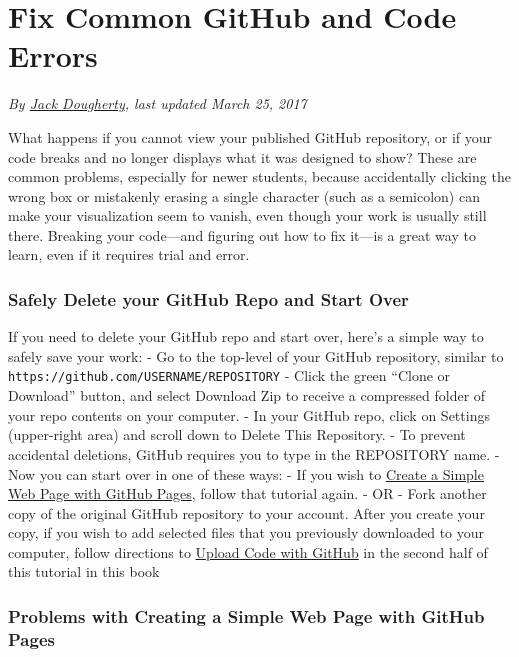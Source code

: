 \documentclass[
  english,
]{book}
\begin{document}
\hypertarget{fix-code}{%
\section{Fix Common GitHub and Code Errors}\label{fix-code}}

\emph{By \href{authors}{Jack Dougherty}, last updated March 25, 2017}

What happens if you cannot view your published GitHub repository, or if your code breaks and no longer displays what it was designed to show? These are common problems, especially for newer students, because accidentally clicking the wrong box or mistakenly erasing a single character (such as a semicolon) can make your visualization seem to vanish, even though your work is usually still there. Breaking your code---and figuring out how to fix it---is a great way to learn, even if it requires trial and error.

\hypertarget{safely-delete-your-github-repo-and-start-over}{%
\subsubsection*{Safely Delete your GitHub Repo and Start Over}\label{safely-delete-your-github-repo-and-start-over}}

If you need to delete your GitHub repo and start over, here's a simple way to safely save your work:
- Go to the top-level of your GitHub repository, similar to \texttt{https://github.com/USERNAME/REPOSITORY}
- Click the green ``Clone or Download'' button, and select Download Zip to receive a compressed folder of your repo contents on your computer.
- In your GitHub repo, click on Settings (upper-right area) and scroll down to Delete This Repository.
- To prevent accidental deletions, GitHub requires you to type in the REPOSITORY name.
- Now you can start over in one of these ways:
- If you wish to \href{github-pages}{Create a Simple Web Page with GitHub Pages}, follow that tutorial again.
- OR
- Fork another copy of the original GitHub repository to your account. After you create your copy, if you wish to add selected files that you previously downloaded to your computer, follow directions to \href{create-repo}{Upload Code with GitHub} in the second half of this tutorial in this book

\hypertarget{problems-with-creating-a-simple-web-page-with-github-pages}{%
\subsubsection*{Problems with Creating a Simple Web Page with GitHub Pages}\label{problems-with-creating-a-simple-web-page-with-github-pages}}
\end{document}
